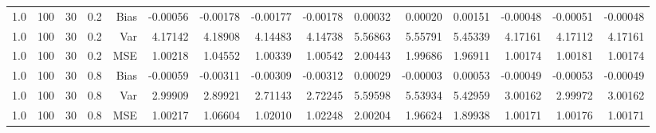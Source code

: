 \begin{table}[!htbp]
\begin{tabular}{lrrrrrrrrrrrrrr}
1.0 & 100 & 30 & 0.2 & Bias & -0.00056 & -0.00178 & -0.00177 & -0.00178 & 0.00032 & 0.00020 & 0.00151 & -0.00048 & -0.00051 & -0.00048 \\
1.0 & 100 & 30 & 0.2 & Var & 4.17142 & 4.18908 & 4.14483 & 4.14738 & 5.56863 & 5.55791 & 5.45339 & 4.17161 & 4.17112 & 4.17161 \\
1.0 & 100 & 30 & 0.2 & MSE & 1.00218 & 1.04552 & 1.00339 & 1.00542 & 2.00443 & 1.99686 & 1.96911 & 1.00174 & 1.00181 & 1.00174 \\
1.0 & 100 & 30 & 0.8 & Bias & -0.00059 & -0.00311 & -0.00309 & -0.00312 & 0.00029 & -0.00003 & 0.00053 & -0.00049 & -0.00053 & -0.00049 \\
1.0 & 100 & 30 & 0.8 & Var & 2.99909 & 2.89921 & 2.71143 & 2.72245 & 5.59598 & 5.53934 & 5.42959 & 3.00162 & 2.99972 & 3.00162 \\
1.0 & 100 & 30 & 0.8 & MSE & 1.00217 & 1.06604 & 1.02010 & 1.02248 & 2.00204 & 1.96624 & 1.89938 & 1.00171 & 1.00176 & 1.00171 \\
\hline
\end{tabular}
\end{table}

